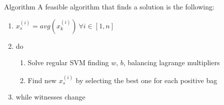 \begin{frame}{Algorithm}
	A feasible algorithm that finds a solution is the following:
	\begin{enumerate}
		\item $x_s^{(i)} = avg(x_k^{(i)}) \ \forall i \in [1, n]$
		\item do
		\begin{enumerate}
			\item Solve regular SVM finding $w$, $b$, balancing lagrange multipliers
			\item Find new $x_s^{(i)}$ by selecting the best one for each positive bag
		\end{enumerate}
		\item while witnesses change
	\end{enumerate}
\end{frame}

